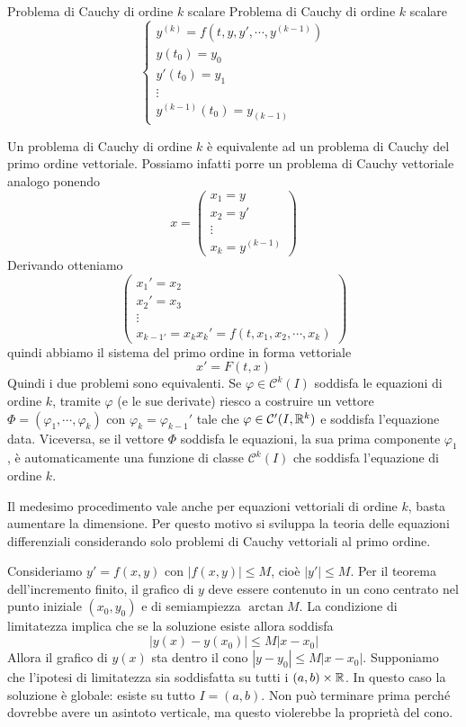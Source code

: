 \documentclass[a4paper]{article}
\begin{document}
\begin{snippetdefinition}{Problema di Cauchy di ordine \(k\) scalare}
    Problema di Cauchy di ordine \(k\) scalare
    \[
        \begin{cases}
            y^{(k)} = f(t,y,y',\cdots, y^{(k-1)}) \\
            y(t_0) = y_0 \\
            y'(t_0) = y_1 \\
            \vdots \\
            y^{(k-1)}(t_0) = y_{(k-1)}
        \end{cases}
    \]
\end{snippetdefinition}

Un problema di Cauchy di ordine \(k\) è equivalente ad un problema di Cauchy del primo ordine vettoriale.
Possiamo infatti porre un problema di Cauchy vettoriale analogo ponendo
\[
    x = \begin{pmatrix}
        x_1 = y \\
        x_2 = y' \\
        \vdots \\
        x_k = y^{(k-1)}
    \end{pmatrix}
\]
Derivando otteniamo
\[
    \begin{pmatrix}
        x_1' = x_2 \\
        x_2' = x_3 \\
        \vdots \\
        x_{k-1'} = x_k
        x_k' = f(t,x_1, x_2, \cdots, x_k)
    \end{pmatrix}
\]
quindi abbiamo il sistema del primo ordine in forma vettoriale
\[
    x' = F(t,x)
\]
Quindi i due problemi sono equivalenti.
Se \(\varphi \in \mathcal C^k(I)\) soddisfa le equazioni di ordine \(k\),
tramite \(\varphi\) (e le sue derivate) riesco a
costruire un vettore \(\Phi = (\varphi_1, \cdots, \varphi_k)\) con \(\varphi_k = \varphi_{k-1}'\) tale che
\(\varphi \in \mathcal C'(I, \mathbb{R}^k)\) e soddisfa l'equazione data.
Viceversa, se il vettore \(\Phi\) soddisfa le equazioni,
la sua prima componente \(\varphi_1\), è automaticamente una funzione di classe \(\mathcal C^k(I)\) che soddisfa l'equazione
di ordine \(k\).

Il medesimo procedimento vale anche per equazioni vettoriali di ordine \(k\),
basta aumentare la dimensione.
Per questo motivo si sviluppa la teoria delle equazioni differenziali considerando solo
problemi di Cauchy vettoriali al primo ordine.

Consideriamo \(y' = f(x,y)\) con \(|f(x,y)| \leq M\),
cioè \(|y'| \leq M\).
Per il teorema dell'incremento finito, il grafico di \(y\) deve essere contenuto in un cono
centrato nel punto iniziale \((x_0, y_0)\) e di semiampiezza \(\arctan M\).
La condizione di limitatezza implica che se la soluzione esiste allora soddisfa \[
    |y(x) - y(x_0)| \leq M|x-x_0|
\]
Allora il grafico di \(y(x)\) sta dentro il cono \(|y-y_0| \leq M|x-x_0|\).
Supponiamo che l'ipotesi di limitatezza sia soddisfatta su tutti i \((a,b) \times \mathbb{R}\).
In questo caso la soluzione è globale: esiste su tutto \(I=(a,b)\).
Non può terminare prima perché dovrebbe avere un asintoto verticale,
ma questo violerebbe la proprietà del cono.
\end{document}
